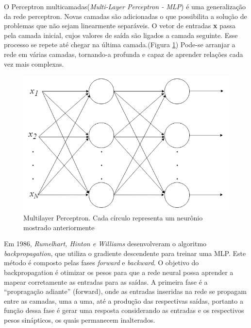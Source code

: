 O Perceptron multicamadas(\textit{Multi-Layer Perceptron - MLP}) é uma generalização da rede perceptron. Novas camadas são adicionadas o que possibilita a solução de problemas que não sejam linearmente separáveis. O vetor de entradas \textbf{x} passa pela camada inicial, cujos valores de saída são ligados a camada seguinte. Esse processo se repete até chegar na última camada.(Figura \ref{fig-mlp})  Pode-se arranjar a rede em várias camadas, tornando-a profunda e capaz de aprender relações cada vez mais complexas.

\begin{figure}[h]
	\centering
	\includegraphics[scale=0.4]{pasta1_figuras/mlp.png}
	\caption{Multilayer Perceptron. Cada círculo representa um neurônio mostrado anteriormente}
	\label{fig-mlp}
\end{figure}

Em 1986, \textit{Rumelhart, Hinton e Williams} \cite{hinton1986} desenvolveram o algoritmo \textit{backpropagation}, que utiliza o gradiente descendente para treinar uma MLP. Este método é composto pelas fases \textit{forward} e \textit{backward}. O objetivo do backpropagation é otimizar os pesos para que a rede neural possa aprender a mapear corretamente as entradas para as saídas. A primeira fase é a ``propragação adiante'' (forward), onde as entradas inseridas na rede se propagam entre as camadas, uma a uma, até a produção das respectivas saídas, portanto a função dessa fase é gerar uma resposta considerando as entradas e os respectivos pesos sinápticos, os quais permanecem inalterados.

